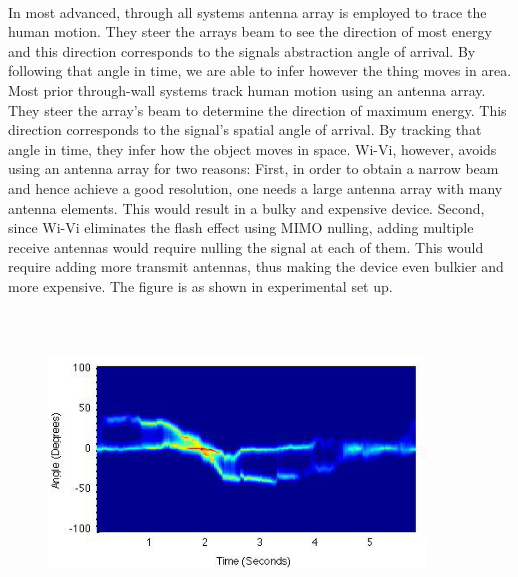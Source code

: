 \documentclass[a4paper,12pt,oneside]{article}
\begin{document}
\paragraph{}
In most advanced, through all systems antenna array is employed to trace the human motion.
They steer the arrays beam to see the direction of most energy and this direction corresponds to
the signals abstraction angle of arrival. By following that angle in time, we are able to infer
however the thing moves in area. Most prior through-wall systems track human motion using an
antenna array. They steer the array’s beam to determine the direction of maximum energy. This
direction corresponds to the signal’s spatial angle of arrival. By tracking that angle in time, they
infer how the object moves in space. Wi-Vi, however, avoids using an antenna array for two
reasons: First, in order to obtain a narrow beam and hence achieve a good resolution, one needs a
large antenna array with many antenna elements. This would result in a bulky and expensive
device. Second, since Wi-Vi eliminates the flash effect using MIMO nulling, adding multiple
receive antennas would require nulling the signal at each of them. This would require adding
more transmit antennas, thus making the device even bulkier and more expensive. The figure is
as shown in experimental set up.

\begin{figure}[H]
\centering
\includegraphics[height=8cm,width=10cm]{6.png}
\end{figure}
\end{document}
